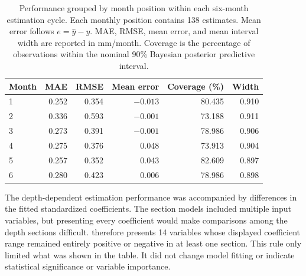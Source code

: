 \begin{table}[htbp]
  \centering
  \small
  \renewcommand{\arraystretch}{1.15}
  \caption[Performance by month position within each estimation cycle.]{Performance grouped by month position within each six-month estimation cycle. Each monthly position contains 138 estimates. Mean error follows $e=\hat{y}-y$. MAE, RMSE, mean error, and mean interval width are reported in mm/month. Coverage is the percentage of observations within the nominal 90\% Bayesian posterior predictive interval.}
  \label{tab:delayed_performance_by_month}
  \begin{tabular}{lrrrrr}
    \toprule
    \textbf{Month} & \textbf{MAE} & \textbf{RMSE} & \textbf{Mean error} & \textbf{Coverage (\%)} & \textbf{Width} \\
    \midrule
    1 & 0.252 & 0.354 & $-0.013$ & 80.435 & 0.910 \\
    2 & 0.336 & 0.593 & $-0.001$ & 73.188 & 0.911 \\
    3 & 0.273 & 0.391 & $-0.001$ & 78.986 & 0.906 \\
    4 & 0.275 & 0.376 & 0.048 & 73.913 & 0.904 \\
    5 & 0.257 & 0.352 & 0.043 & 82.609 & 0.897 \\
    6 & 0.280 & 0.423 & 0.006 & 78.986 & 0.898 \\
    \bottomrule
  \end{tabular}
\end{table}

\FloatBarrier

The depth-dependent estimation performance was accompanied by differences in the fitted standardized coefficients. The section models included multiple input variables, but presenting every coefficient would make comparisons among the depth sections difficult.  therefore presents 14 variables whose displayed coefficient range remained entirely positive or negative in at least one section. This rule only limited what was shown in the table. It did not change model fitting or indicate statistical significance or variable importance.

